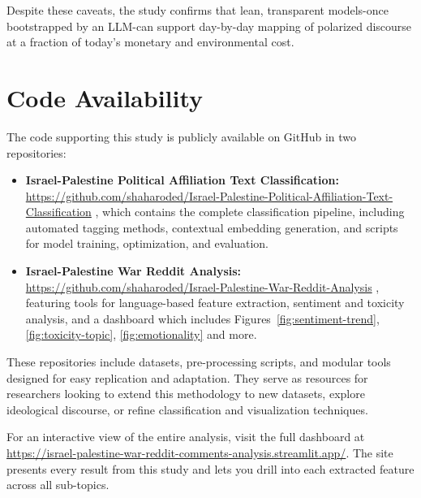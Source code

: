 \documentclass[letterpaper]{article} %
\begin{document}
Despite these caveats, the study confirms that lean, transparent models-once bootstrapped by an LLM-can support day-by-day mapping of polarized discourse at a fraction of today’s monetary and environmental cost.


\section*{Code Availability}\label{sec:code-availability}

The code supporting this study is publicly available on GitHub in two repositories:

\begin{itemize} 
    \item \textbf{Israel-Palestine Political Affiliation Text Classification:} \url{https://github.com/shaharoded/Israel-Palestine-Political-Affiliation-Text-Classification} \cite{Israel-Palestine-Political-Affiliation-Text-Classification}, which contains the complete classification pipeline, including automated tagging methods, contextual embedding generation, and scripts for model training, optimization, and evaluation. 
    \item \textbf{Israel-Palestine War Reddit Analysis:} \url{https://github.com/shaharoded/Israel-Palestine-War-Reddit-Analysis} \cite{Israel-Palestine-War-Reddit-Analysis}, featuring tools for language-based feature extraction, sentiment and toxicity analysis, and a dashboard which includes Figures~\ref{fig:sentiment-trend}, \ref{fig:toxicity-topic}, \ref{fig:emotionality} and more. 
\end{itemize}

These repositories include datasets, pre-processing scripts, and modular tools designed for easy replication and adaptation. They serve as resources for researchers looking to extend this methodology to new datasets, explore ideological discourse, or refine classification and visualization techniques.

For an interactive view of the entire analysis, visit the full dashboard at \url{https://israel-palestine-war-reddit-comments-analysis.streamlit.app/}. The site presents every result from this study and lets you drill into each extracted feature across all sub-topics.



\end{document}
